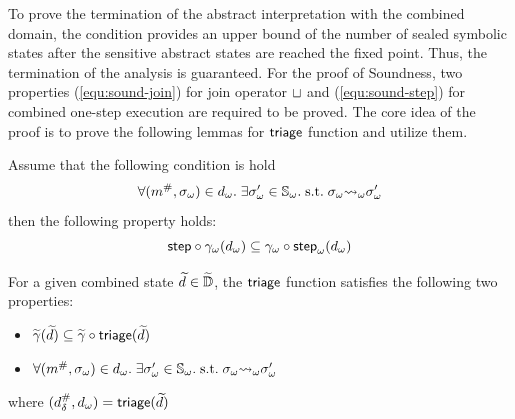 To prove the termination of the abstract interpretation with the combined
domain, the condition provides an upper bound of the number of sealed symbolic
states after the sensitive abstract states are reached the fixed point.  Thus,
the termination of the analysis is guaranteed.  For the proof of Soundness, two
properties (\ref{equ:sound-join}) for join operator $\sqcup$ and
(\ref{equ:sound-step}) for combined one-step execution are required to be
proved.  The core idea of the proof is to prove the following lemmas for
$\textsf{triage}$ function and utilize them.
\begin{lemma}\label{lemma:step-symb}
  Assume that the following condition is hold
  \[
    \forall ({m}^{\#}, {\sigma}_\omega) \in {d}_\omega. \; \exists {\sigma}_\omega' \in
    {\mathbb{S}}_\omega. \; \text{s.t.} \; {\sigma}_\omega {\leadsto}_\omega {\sigma}_\omega'
  \]
  then the following property holds:
  \[
    \textsf{step} \circ {\gamma}_\omega({d}_\omega) \subseteq
    {\gamma}_\omega \circ {\textsf{step}}_\omega({d}_\omega)\\
  \]
\end{lemma}
\begin{lemma}\label{lemma:triage}
  For a given combined state $\widetilde{d} \in \widetilde{\mathbb{D}}$, the $\textsf{triage}$ function
  satisfies the following two properties:
  \begin{itemize}
    \item $\widetilde{\gamma}(\widetilde{d}) \subseteq \widetilde{\gamma} \circ \textsf{triage}(\widetilde{d})$
    \item $\forall ({m}^{\#}, {\sigma}_\omega) \in {d}_\omega. \; \exists {\sigma}_\omega' \in
      {\mathbb{S}}_\omega.  \; \text{s.t.} \; {\sigma}_\omega {\leadsto}_\omega {\sigma}_\omega'$
  \end{itemize}
  where $({{d}^{\#}_\delta}, {d}_\omega) = \textsf{triage}(\widetilde{d})$
\end{lemma}
